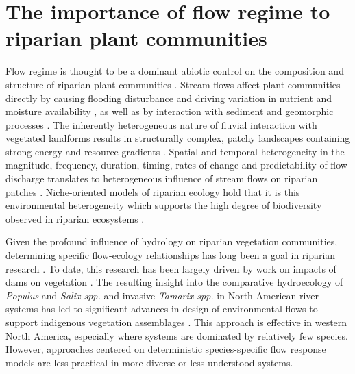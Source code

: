 \documentclass[12pt,a4paper]{memoir}
\begin{document}
\section{The importance of flow regime to riparian plant communities}
Flow regime is thought to be a dominant abiotic control on the composition and structure of riparian plant communities \citep{Poff1997}. Stream flows affect plant communities directly by causing flooding disturbance and driving variation in nutrient and moisture availability \citep{Naiman1997}, as well as by interaction with sediment and geomorphic processes \citep{Corenblit2007}. The inherently heterogeneous nature of fluvial interaction with vegetated landforms results in structurally complex, patchy landscapes containing strong energy and resource gradients \citep{Naiman2005}. Spatial and temporal heterogeneity in the magnitude, frequency, duration, timing, rates of change and predictability of flow discharge \citep{Poff1997, Kennard2010} translates to heterogeneous influence of stream flows on riparian patches \citep{Poff1997, Naiman2008}. Niche-oriented models of riparian ecology  hold that it is this environmental heterogeneity which supports the high degree of biodiversity observed in riparian ecosystems \citep{Palmer1997, Bornette2008}.

Given the profound influence of hydrology on riparian vegetation communities, determining specific flow-ecology relationships has long been a goal in riparian research \citep{Auble1994, Lytle2004}. To date, this research has been largely driven by work on impacts of dams on vegetation \citep{Goodwid1997, Nilsson2002}. The resulting insight into the comparative hydroecology of \textit{Populus} and \textit{Salix spp.} and invasive \textit{Tamarix spp.} in North American river systems \citep{Mahoney1998, Shafroth2002} has led to significant advances in design of environmental flows to support indigenous vegetation assemblages \citep{Shafroth2010}. This approach is effective in western North America, especially where systems are dominated by relatively few species. However, approaches centered on deterministic species-specific flow response models are less practical in more diverse or less understood systems. 
\end{document}
